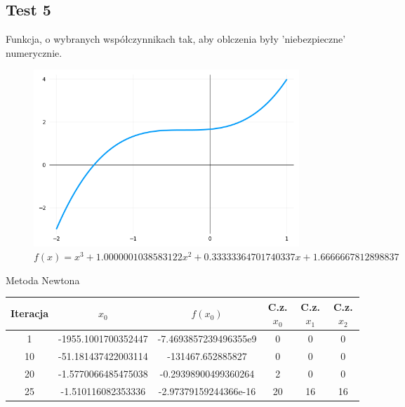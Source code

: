 \documentclass[a4paper]{article}
\begin{document}
\newpage
\subsection{Test 5}
Funkcja, o wybranych współczynnikach tak, aby oblczenia były 'niebezpieczne' numerycznie.
    \begin{figure}[h]
        \centering
        \includegraphics[width=10cm]{5}
        \caption{$f(x) = x^3 + 1.0000001038583122x^2 + 0.33333364701740337x + 1.6666667812898837$}
    \end{figure}

    \begin{center}
        Metoda Newtona
    \end{center}
    \begin{center}
        \begin{tabular}{|c|c|c|c|c|c|} 
            \hline
            Iteracja & $x_0$ & $f(x_0)$ & C.z. $x_0$ & C.z. $x_1$ & C.z. $x_2$ \\
            \hline
            1 & -1955.1001700352447 & -7.4693857239496355e9 & 0 & 0 & 0 \\
            \hline
            10 & -51.181437422003114 & -131467.652885827 & 0 & 0 & 0 \\
            \hline
            20 & -1.5770066485475038 & -0.29398900499360264 & 2 & 0 & 0 \\
            \hline
            25 & -1.510116082353336 & -2.97379159244366e-16 & 20 & 16 & 16 \\
            \hline
        \end{tabular}
    \end{center}
        
    \vspace{5mm}
\end{document}
